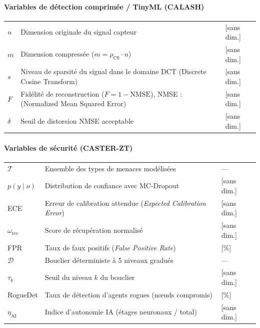 \paragraph{Variables de détection comprimée / TinyML (CALASH)}
\begin{longtable}{lp{3in}l}
$n$ & Dimension originale du signal capteur & [sans dim.] \\
$m$ & Dimension compressée ($m = \rho_{\text{CS}} \cdot n$) & [sans dim.] \\
$s$ & Niveau de sparsité du signal dans le domaine DCT (Discrete Cosine Transform) & [sans dim.] \\
$F$ & Fidélité de reconstruction ($F = 1 - \text{NMSE}$), NMSE : (Normalized Mean Squared Error) & [sans dim.] \\
$\delta$ & Seuil de distorsion NMSE acceptable & [sans dim.] \\
\end{longtable}

\paragraph{Variables de sécurité (CASTER-ZT)}
\begin{longtable}{lp{3in}l}
$\mathcal{T}$ & Ensemble des types de menaces modélisées & --- \\
$p(y \mid o)$ & Distribution de confiance avec MC-Dropout & [sans dim.] \\
ECE & Erreur de calibration attendue (\emph{Expected Calibration Error}) & [sans dim.] \\
$\omega_{\text{rec}}$ & Score de récupération normalisé & [sans dim.] \\
FPR & Taux de faux positifs (\emph{False Positive Rate}) & [\%] \\
$\mathcal{D}$ & Bouclier déterministe à 5 niveaux gradués & --- \\
$\tau_k$ & Seuil du niveau $k$ du bouclier & [sans dim.] \\
RogueDet & Taux de détection d'agents rogues (nœuds compromis) & [\%] \\
$\eta_{\text{AI}}$ & Indice d'autonomie IA (étages neuronaux / total) & [sans dim.] \\
\end{longtable}

\bigskip

